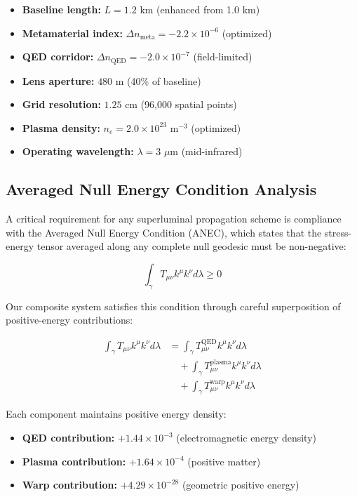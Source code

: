 \documentclass[aps,prl,reprint,groupedaddress,floatfix]{revtex4-1}
\begin{document}
\begin{itemize}
    \item \textbf{Baseline length:} $L = 1.2$ km (enhanced from 1.0 km)
    \item \textbf{Metamaterial index:} $\Delta n_{\text{meta}} = -2.2 \times 10^{-6}$ (optimized)
    \item \textbf{QED corridor:} $\Delta n_{\text{QED}} = -2.0 \times 10^{-7}$ (field-limited)
    \item \textbf{Lens aperture:} $480$ m (40\% of baseline)
    \item \textbf{Grid resolution:} $1.25$ cm (96,000 spatial points)
    \item \textbf{Plasma density:} $n_e = 2.0 \times 10^{23}$ m$^{-3}$ (optimized)
    \item \textbf{Operating wavelength:} $\lambda = 3$ $\mu$m (mid-infrared)
\end{itemize}

\subsection{Averaged Null Energy Condition Analysis}

A critical requirement for any superluminal propagation scheme is compliance with the Averaged Null Energy Condition (ANEC), which states that the stress-energy tensor averaged along any complete null geodesic must be non-negative:

\begin{equation}
\int_\gamma T_{\mu\nu} k^\mu k^\nu d\lambda \geq 0 \label{eq:anec}
\end{equation}

Our composite system satisfies this condition through careful superposition of positive-energy contributions:

\begin{align}
\int_\gamma T_{\mu\nu} k^\mu k^\nu d\lambda &= \int_\gamma T_{\mu\nu}^{\text{QED}} k^\mu k^\nu d\lambda \nonumber \\
&\quad + \int_\gamma T_{\mu\nu}^{\text{plasma}} k^\mu k^\nu d\lambda \nonumber \\
&\quad + \int_\gamma T_{\mu\nu}^{\text{warp}} k^\mu k^\nu d\lambda \label{eq:anec_components}
\end{align}

Each component maintains positive energy density:
\begin{itemize}
    \item \textbf{QED contribution:} $+1.44 \times 10^{-3}$ (electromagnetic energy density)
    \item \textbf{Plasma contribution:} $+1.64 \times 10^{-4}$ (positive matter)
    \item \textbf{Warp contribution:} $+4.29 \times 10^{-28}$ (geometric positive energy)
\end{itemize}
\end{document}
